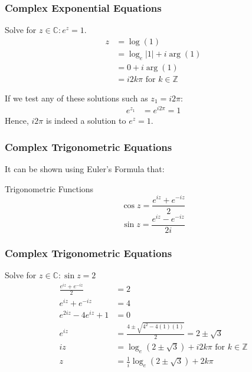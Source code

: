\documentclass{beamer}
\begin{document}
\begin{frame}
  \frametitle{Complex Exponential Equations}
  \begin{example}
    Solve for $z \in \mathbb{C}: e^z = 1$.
    \pause
    \begin{align*}
      z & = \log(1)\\
        & = \log_e|1| + i\arg(1)\\
        & = 0 + i\arg(1)\\
        & = i2k\pi \mbox{ for } k \in \mathbb{Z}
    \end{align*}
  \end{example}
  \pause
  If we test any of these solutions such as $z_1 = i2\pi$:
  \begin{align*}
    e^{z_1} & = e^{i2\pi} = 1
  \end{align*}
  Hence, $i2\pi$ is indeed a solution to $e^z = 1$.
\end{frame}

\begin{frame}
  \frametitle{Complex Trigonometric Equations}
  It can be shown using Euler's Formula that:
  \begin{block}{Trigonometric Functions}
    \[\cos z = \frac{e^{iz} + e^{-iz}}{2}\]
    \[\sin z = \frac{e^{iz} - e^{-iz}}{2i}\]
  \end{block}
\end{frame}
\begin{frame}
  \frametitle{Complex Trigonometric Equations}
  \begin{example}
  Solve for $z \in \mathbb{C}: \sin z = 2$
  \pause
  \begin{align*}
    \frac{e^{iz} + e^{-iz}}{2} & = 2\\
    e^{iz} + e^{-iz} & = 4\\
    e^{2iz} - 4e^{iz} + 1 & = 0\\
    e^{iz} & = \frac{4 \pm \sqrt{4^2 - 4(1)(1)}}{2} = 2 \pm \sqrt{3}\\
    iz & = \log_e(2 \pm \sqrt{3}) + i2k\pi \mbox{ for } k \in \mathbb{Z}\\
    z & = \frac{1}{i}\log_e(2 \pm \sqrt{3}) + 2k\pi
  \end{align*}
  \end{example}
\end{frame}
\end{document}
